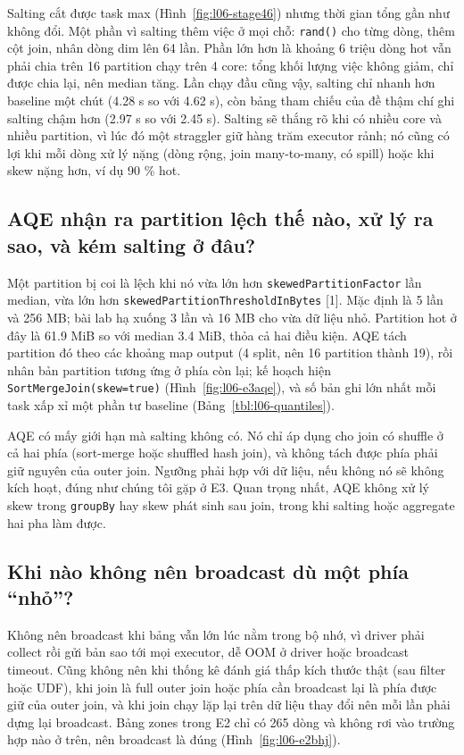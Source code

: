 \documentclass[
  12pt,
  a4paper,
]{article}
\begin{document}
Salting cắt được task max (Hình~\ref{fig:l06-stage46}) nhưng thời gian
tổng gần như không đổi. Một phần vì salting thêm việc ở mọi chỗ:
\texttt{rand()} cho từng dòng, thêm cột join, nhân dòng dim lên 64 lần.
Phần lớn hơn là khoảng 6 triệu dòng hot vẫn phải chia trên 16 partition
chạy trên 4 core: tổng khối lượng việc không giảm, chỉ được chia lại,
nên median tăng. Lần chạy đầu cũng vậy, salting chỉ nhanh hơn baseline
một chút (4.28 s so với 4.62 s), còn bảng tham chiếu của đề thậm chí ghi
salting chậm hơn (2.97 s so với 2.45 s). Salting sẽ thắng rõ khi có
nhiều core và nhiều partition, vì lúc đó một straggler giữ hàng trăm
executor rảnh; nó cũng có lợi khi mỗi dòng xử lý nặng (dòng rộng, join
many-to-many, có spill) hoặc khi skew nặng hơn, ví dụ 90 \% hot.

\subsection{AQE nhận ra partition lệch thế nào, xử lý ra sao, và kém
salting ở đâu?}\label{sec:l06-q4}

Một partition bị coi là lệch khi nó vừa lớn hơn
\texttt{skewedPartitionFactor}\allowbreak{} lần median, vừa lớn hơn
\texttt{skewedPartitionThresholdInBytes}\allowbreak{} {[}1{]}. Mặc định
là 5 lần và 256 MB; bài lab hạ xuống 3 lần và 16 MB cho vừa dữ liệu nhỏ.
Partition hot ở đây là 61.9 MiB so với median 3.4 MiB, thỏa cả hai điều
kiện. AQE tách partition đó theo các khoảng map output (4 split, nên 16
partition thành 19), rồi nhân bản partition tương ứng ở phía còn lại; kế
hoạch hiện
\texttt{SortMergeJoin(skew=}\allowbreak{}\texttt{true)}\allowbreak{}
(Hình~\ref{fig:l06-e3aqe}), và số bản ghi lớn nhất mỗi task xấp xỉ một
phần tư baseline (Bảng~\ref{tbl:l06-quantiles}).

AQE có mấy giới hạn mà salting không có. Nó chỉ áp dụng cho join có
shuffle ở cả hai phía (sort-merge hoặc shuffled hash join), và không
tách được phía phải giữ nguyên của outer join. Ngưỡng phải hợp với dữ
liệu, nếu không nó sẽ không kích hoạt, đúng như chúng tôi gặp ở E3. Quan
trọng nhất, AQE không xử lý skew trong \texttt{groupBy} hay skew phát
sinh sau join, trong khi salting hoặc aggregate hai pha làm được.

\subsection{Khi nào không nên broadcast dù một phía
``nhỏ''?}\label{sec:l06-q5}

Không nên broadcast khi bảng vẫn lớn lúc nằm trong bộ nhớ, vì driver
phải collect rồi gửi bản sao tới mọi executor, dễ OOM ở driver hoặc
broadcast timeout. Cũng không nên khi thống kê đánh giá thấp kích thước
thật (sau filter hoặc UDF), khi join là full outer join hoặc phía cần
broadcast lại là phía được giữ của outer join, và khi join chạy lặp lại
trên dữ liệu thay đổi nên mỗi lần phải dựng lại broadcast. Bảng zones
trong E2 chỉ có 265 dòng và không rơi vào trường hợp nào ở trên, nên
broadcast là đúng (Hình~\ref{fig:l06-e2bhj}).
\end{document}
